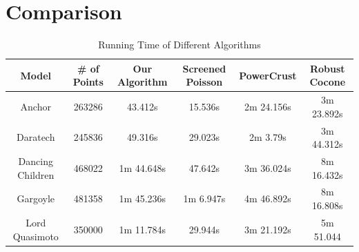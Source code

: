 \documentclass[12pt,a4paper]{article}
\begin{document}
\section{Comparison}
\begin{table}[h!]
	\centering
	\begin{tabular}{||c|c|cccc||} 
		\hline
		Model & \# of Points & Our Algorithm & Screened Poisson & PowerCrust & Robust Cocone \\
		\hline\hline                                                          
		Anchor & 263286 & 43.412s & 15.536s & 2m 24.156s  & 3m 23.892s\\
		Daratech & 245836 & 49.316s & 29.023s & 2m 3.79s  & 3m 44.312s\\ 
		Dancing Children & 468022 & 1m 44.648s & 47.642s & 3m 36.024s  & 8m 16.432s\\ 
		Gargoyle & 481358 & 1m 45.236s & 1m 6.947s & 4m 46.892s & 8m 16.808s\\ 
		Lord Quasimoto & 350000 & 1m 11.784s & 29.944s & 3m 21.192s  & 5m 51.044\\
		\hline
	\end{tabular}
	\caption{Running Time of Different Algorithms}
	\label{table:1}
\end{table}


\newpage
\end{document}
